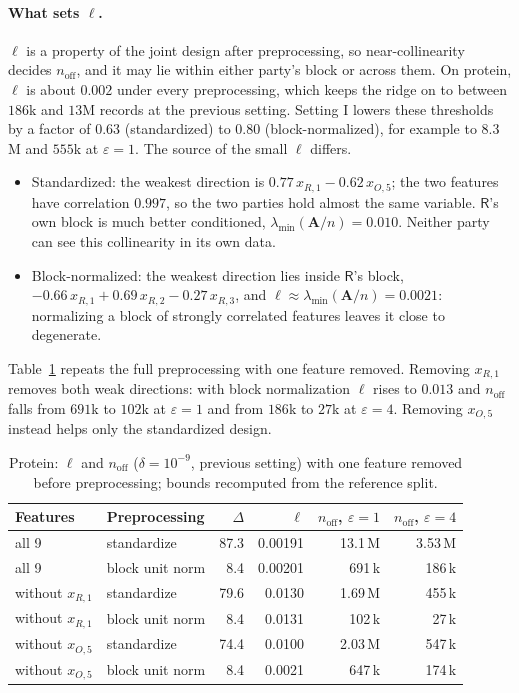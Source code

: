 \documentclass[11pt]{article}
\theoremstyle{definition}
\theoremstyle{plain}
\newcommand{\bA}{\mathbf{A}}
\newcommand{\Party}[1]{\textsf{#1}}
\newcommand{\Rp}{\Party{R}}
\begin{document}
\paragraph{What sets $\ell$.} $\ell$ is a property of the joint design after preprocessing, so near-collinearity decides $n_{\mathrm{off}}$, and it may lie within either party's block or across them. On protein, $\ell$ is about $0.002$ under every preprocessing, which keeps the ridge on to between $186$k and $13$M records at the previous setting. Setting I lowers these thresholds by a factor of $0.63$ (standardized) to $0.80$ (block-normalized), for example to $8.3$M and $555$k at $\varepsilon = 1$. The source of the small $\ell$ differs.
\begin{itemize}[noitemsep]
  \item Standardized: the weakest direction is $0.77\,x_{R,1} - 0.62\,x_{O,5}$; the two features have correlation $0.997$, so the two parties hold almost the same variable. $\Rp$'s own block is much better conditioned, $\lambda_{\min}(\bA/n) = 0.010$. Neither party can see this collinearity in its own data.
  \item Block-normalized: the weakest direction lies inside $\Rp$'s block, $-0.66\,x_{R,1} + 0.69\,x_{R,2} - 0.27\,x_{R,3}$, and $\ell \approx \lambda_{\min}(\bA/n) = 0.0021$: normalizing a block of strongly correlated features leaves it close to degenerate.
\end{itemize}
Table~\ref{tab:noff_drop} repeats the full preprocessing with one feature removed. Removing $x_{R,1}$ removes both weak directions: with block normalization $\ell$ rises to $0.013$ and $n_{\mathrm{off}}$ falls from $691$k to $102$k at $\varepsilon = 1$ and from $186$k to $27$k at $\varepsilon = 4$. Removing $x_{O,5}$ instead helps only the standardized design.

\begin{table}[ht]
  \centering\small
  \caption{Protein: $\ell$ and $n_{\mathrm{off}}$ ($\delta = 10^{-9}$, previous setting) with one feature removed before preprocessing; bounds recomputed from the reference split.}
  \label{tab:noff_drop}
  \begin{tabular}{@{}llrrrr@{}}
    \toprule
    Features & Preprocessing & $\Delta$ & $\ell$ & $n_{\mathrm{off}}$, $\varepsilon = 1$ & $n_{\mathrm{off}}$, $\varepsilon = 4$ \\
    \midrule
    all 9 & standardize & 87.3 & 0.00191 & 13.1\,M & 3.53\,M \\
    all 9 & block unit norm & 8.4 & 0.00201 & 691\,k & 186\,k \\
    without $x_{R,1}$ & standardize & 79.6 & 0.0130 & 1.69\,M & 455\,k \\
    without $x_{R,1}$ & block unit norm & 8.4 & 0.0131 & 102\,k & 27\,k \\
    without $x_{O,5}$ & standardize & 74.4 & 0.0100 & 2.03\,M & 547\,k \\
    without $x_{O,5}$ & block unit norm & 8.4 & 0.0021 & 647\,k & 174\,k \\
    \bottomrule
  \end{tabular}
\end{table}
\end{document}
